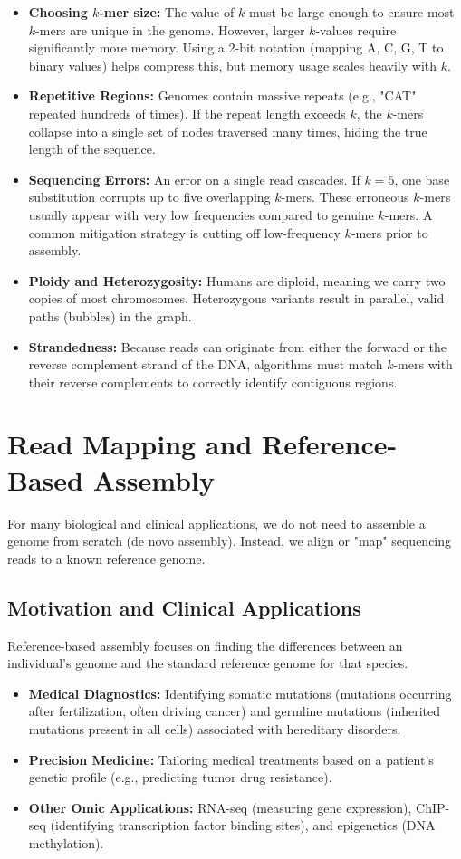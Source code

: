 \documentclass[11pt,a4paper]{article}
\begin{document}
\begin{itemize}
    \item \textbf{Choosing $k$-mer size:} The value of $k$ must be large enough to ensure most $k$-mers are unique in the genome. However, larger $k$-values require significantly more memory. Using a 2-bit notation (mapping A, C, G, T to binary values) helps compress this, but memory usage scales heavily with $k$.
    \item \textbf{Repetitive Regions:} Genomes contain massive repeats (e.g., "CAT" repeated hundreds of times). If the repeat length exceeds $k$, the $k$-mers collapse into a single set of nodes traversed many times, hiding the true length of the sequence.
    \item \textbf{Sequencing Errors:} An error on a single read cascades. If $k=5$, one base substitution corrupts up to five overlapping $k$-mers. These erroneous $k$-mers usually appear with very low frequencies compared to genuine $k$-mers. A common mitigation strategy is cutting off low-frequency $k$-mers prior to assembly.
    \item \textbf{Ploidy and Heterozygosity:} Humans are diploid, meaning we carry two copies of most chromosomes. Heterozygous variants result in parallel, valid paths (bubbles) in the graph. 
    \item \textbf{Strandedness:} Because reads can originate from either the forward or the reverse complement strand of the DNA, algorithms must match $k$-mers with their reverse complements to correctly identify contiguous regions.
\end{itemize}

\section{Read Mapping and Reference-Based Assembly}
For many biological and clinical applications, we do not need to assemble a genome from scratch (de novo assembly). Instead, we align or "map" sequencing reads to a known reference genome.

\subsection{Motivation and Clinical Applications}
Reference-based assembly focuses on finding the differences between an individual's genome and the standard reference genome for that species.

\begin{itemize}
    \item \textbf{Medical Diagnostics:} Identifying somatic mutations (mutations occurring after fertilization, often driving cancer) and germline mutations (inherited mutations present in all cells) associated with hereditary disorders.
    \item \textbf{Precision Medicine:} Tailoring medical treatments based on a patient's genetic profile (e.g., predicting tumor drug resistance).
    \item \textbf{Other Omic Applications:} RNA-seq (measuring gene expression), ChIP-seq (identifying transcription factor binding sites), and epigenetics (DNA methylation).
\end{itemize}
\end{document}
